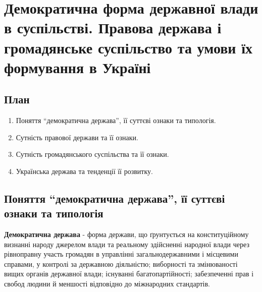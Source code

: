 \section{Демократична форма державної влади в суспільстві. Правова держава і громадянське суспільство та умови їх формування в Україні}
\subsection{План}
\begin{enumerate}
\item Поняття “демократична держава”, її суттєві ознаки та типологія.
\item Сутність правової держави та її ознаки.
\item Сутність громадянського суспільства та її ознаки.
\item Українська держава та тенденції її розвитку.
\end{enumerate}
\subsection{Поняття “демократична держава”, її суттєві ознаки та типологія}
\textbf{Демократична держава} - форма держави, що ґрунтується на конституційному визнанні народу джерелом влади та реальному здійсненні народної влади через рівноправну участь громадян в управлінні загальнодержавними і місцевими справами, у контролі за державною діяльністю; виборності та змінюваності вищих органів державної влади; існуванні багатопартійності; забезпеченні прав і свобод людини й меншості відповідно до міжнародних стандартів.

